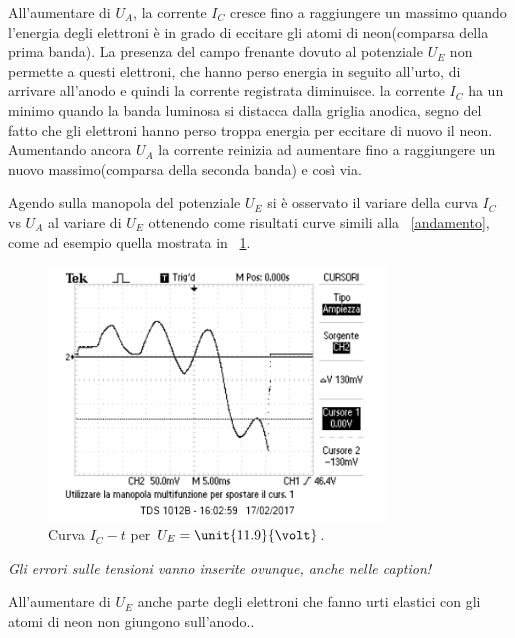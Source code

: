 \documentclass[10pt,a4paper]{article}
\begin{document}
All'aumentare di $U_{A}$, la corrente $I_{C}$ cresce fino a raggiungere un massimo quando l'energia degli elettroni è in grado di eccitare gli atomi di neon(comparsa della prima banda). La presenza del campo frenante dovuto al potenziale $U_{E}$ non permette a questi elettroni, che hanno perso energia in seguito all'urto, di arrivare all'anodo e quindi la corrente registrata diminuisce. la corrente $I_{C}$ ha un minimo quando la banda luminosa si distacca dalla griglia anodica, segno del fatto che gli elettroni hanno perso troppa energia per eccitare di nuovo il neon.
Aumentando ancora $U_{A}$ la corrente reinizia ad aumentare fino a raggiungere un nuovo massimo(comparsa della seconda banda) e così via.

Agendo sulla manopola del potenziale $U_{E}$ si è osservato il variare della curva $I_{C}$ vs $U_{A}$ al variare di $U_{E}$ ottenendo come risultati curve simili alla \figurename{~\ref{andamento}}, come ad esempio quella mostrata in \figurename{~\ref{task5}}.


\begin{figure}[h!]
	\centering
		\includegraphics[width=0.80\textwidth]{../oscilloscopio/Task5.png}
	\caption{Curva $I_{C} - t$ per $U_{E}=\unit{11.9}{\volt}$.}
	\label{task5}
\end{figure}

\emph{Gli errori sulle tensioni vanno inserite ovunque, anche nelle caption!}

All'aumentare di $U_{E}$ anche parte degli elettroni che fanno urti elastici con gli atomi di neon non giungono sull'anodo..%
  
\end{document}
